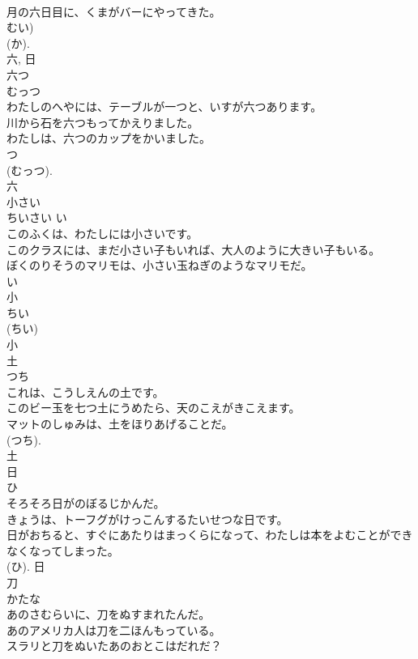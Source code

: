 \documentclass[8pt]{extreport}
\begin{document}
\begin{CJK}{UTF8}{min}
\\	月の六日目に、くまがバーにやってきた。	
\\	むい) 
\\	(か). 
\\	六, 日	
\\	六つ	
\\	むっつ	
\\	わたしのへやには、テーブルが一つと、いすが六つあります。	
\\	川から石を六つもってかえりました。	
\\	わたしは、六つのカップをかいました。	
\\	つ 
\\	(むっつ). 
\\	六	
\\	小さい	
\\	ちいさい	い 
\\	このふくは、わたしには小さいです。	
\\	このクラスには、まだ小さい子もいれば、大人のように大きい子もいる。	
\\	ぼくのりそうのマリモは、小さい玉ねぎのようなマリモだ。	
\\	い 
\\	小 
\\	ちい 
\\	(ちい) 
\\	小	
\\	土	
\\	つち	
\\	これは、こうしえんの土です。	
\\	このビー玉を七つ土にうめたら、天のこえがきこえます。	
\\	マットのしゅみは、土をほりあげることだ。	
\\	(つち). 
\\	土	
\\	日	
\\	ひ	
\\	そろそろ日がのぼるじかんだ。	
\\	きょうは、トーフグがけっこんするたいせつな日です。	
\\	日がおちると、すぐにあたりはまっくらになって、わたしは本をよむことができなくなってしまった。	
\\	(ひ).	日	
\\	刀	
\\	かたな	
\\	あのさむらいに、刀をぬすまれたんだ。	
\\	あのアメリカ人は刀を二ほんもっている。	
\\	スラリと刀をぬいたあのおとこはだれだ？	

\end{CJK}
\end{document}

